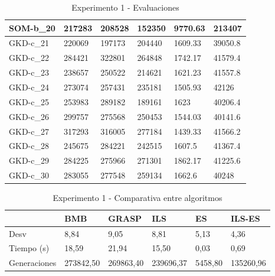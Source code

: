 \documentclass[11pt,a4paper]{article}
\begin{document}
\begin{table}[H]
\begin{tabular}{l|l|l|l|l|l|}
			\multicolumn{1}{|l|}{SOM-b\_20} & 217283 & 208528 & 152350 & 9770.63 & 213407 \\ \hline
			\multicolumn{1}{|l|}{GKD-c\_21} & 220069 & 197173 & 204440 & 1609.33 & 39050.8 \\ \hline
			\multicolumn{1}{|l|}{GKD-c\_22} & 284421 & 322801 & 264848 & 1742.17 & 41579.4 \\ \hline
			\multicolumn{1}{|l|}{GKD-c\_23} & 238657 & 250522 & 214621 & 1621.23 & 41557.8 \\ \hline
			\multicolumn{1}{|l|}{GKD-c\_24} & 273074 & 257431 & 235181 & 1505.93 & 42126 \\ \hline
			\multicolumn{1}{|l|}{GKD-c\_25} & 253983 & 289182 & 189161 & 1623 & 40206.4 \\ \hline
			\multicolumn{1}{|l|}{GKD-c\_26} & 299757 & 275568 & 250453 & 1544.03 & 40141.6 \\ \hline
			\multicolumn{1}{|l|}{GKD-c\_27} & 317293 & 316005 & 277184 & 1439.33 & 41566.2 \\ \hline
			\multicolumn{1}{|l|}{GKD-c\_28} & 245675 & 284221 & 242515 & 1607.5 & 41367.4 \\ \hline
			\multicolumn{1}{|l|}{GKD-c\_29} & 284225 & 275966 & 271301 & 1862.17 & 41225.6 \\ \hline
			\multicolumn{1}{|l|}{GKD-c\_30} & 283055 & 277548 & 259134 & 1662.6 & 40248 \\ \hline
		\end{tabular}
		\caption{ Experimento 1 - Evaluaciones }
		\label{313}
	\end{table}

	\begin{table}[H]
		\centering
		\begin{tabular}{l|l|l|l|l|l|}
			\cline{2-6}
			& BMB & GRASP & ILS & ES & ILS-ES \\ \hline
			\multicolumn{1}{|l|}{Desv} & 8,84 & 9,05 & 8,81 & 5,13 & 4,36 \\ \hline
			\multicolumn{1}{|l|}{Tiempo (s)} & 18,59 & 21,94 & 15,50 & 0,03 & 0,69 \\ \hline
			\multicolumn{1}{|l|}{Generaciones} & 273842,50 & 269863,40 & 239696,37 & \multicolumn{1}{c|}{5458,80} & 135260,96 \\ \hline
		\end{tabular}
		\caption{ Experimento 1 - Comparativa entre algoritmos }
		\label{314}
	\end{table}
\end{document}
